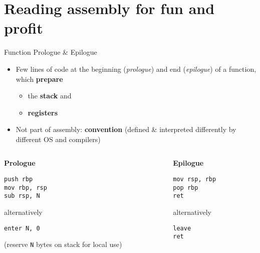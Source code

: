 \begin{frame}
    \centering
    \scalebox{3}{Reading x86-64 Assembly}

    \scalebox{2}{\ldots for fun and profit}
\end{frame}

\section{Reading assembly for fun and profit}

\begin{frame}[fragile]{Function Prologue \& Epilogue}
    \begin{itemize}
        \item Few lines of code at the beginning (\textit{prologue}) and end (\textit{epilogue}) of a function, which \textbf{prepare}
        \begin{itemize}
            \item the \textbf{stack} and 
            \item \textbf{registers}
        \end{itemize}
        \item Not part of assembly: \textbf{convention} (defined \& interpreted differently by different OS and compilers)
    \end{itemize}

    \begin{columns}[t]
        \begin{column}{.45\textwidth}
            \textbf{Prologue}
            \begin{lstlisting}[language={}]
push rbp
mov rbp, rsp
sub rsp, N
            \end{lstlisting}
            alternatively
            \begin{lstlisting}[language={}]
enter N, 0
            \end{lstlisting}
            (reserve \texttt{N} bytes on stack for local use)
        \end{column}
        \begin{column}{.45\textwidth}
            \textbf{Epilogue}
            \begin{lstlisting}[language={}]
mov rsp, rbp
pop rbp
ret
            \end{lstlisting}
            alternatively
            \begin{lstlisting}[language={}]
leave
ret
            \end{lstlisting}
        \end{column}
    \end{columns}
\end{frame}

